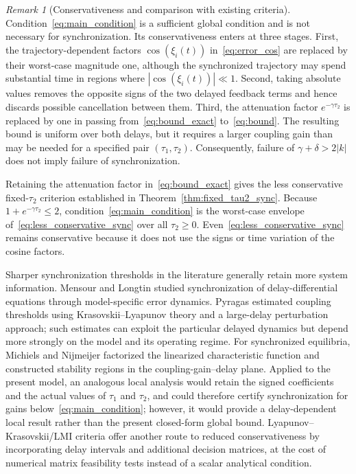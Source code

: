 \documentclass[11pt]{article}
\theoremstyle{remark}
\newtheorem{remark}[theorem]{Remark}
\begin{document}
{\begin{remark}[Conservativeness and comparison with existing criteria]
Condition~\eqref{eq:main_condition} is a sufficient global condition and is not necessary for synchronization. Its conservativeness enters at three stages. First, the trajectory-dependent factors $\cos(\xi_i(t))$ in~\eqref{eq:error_cos} are replaced by their worst-case magnitude one, although the synchronized trajectory may spend substantial time in regions where $|\cos(\xi_i(t))|\ll1$. Second, taking absolute values removes the opposite signs of the two delayed feedback terms and hence discards possible cancellation between them. Third, the attenuation factor $e^{-\gamma\tau_2}$ is replaced by one in passing from~\eqref{eq:bound_exact} to~\eqref{eq:bound}. The resulting bound is uniform over both delays, but it requires a larger coupling gain than may be needed for a specified pair $(\tau_1,\tau_2)$. Consequently, failure of $\gamma+\delta>2|k|$ does not imply failure of synchronization.

Retaining the attenuation factor in~\eqref{eq:bound_exact} gives the less conservative fixed-$\tau_2$ criterion established in Theorem~\ref{thm:fixed_tau2_sync}. Because $1+e^{-\gamma\tau_2}\leq2$, condition~\eqref{eq:main_condition} is the worst-case envelope of~\eqref{eq:less_conservative_sync} over all $\tau_2\geq0$. Even~\eqref{eq:less_conservative_sync} remains conservative because it does not use the signs or time variation of the cosine factors.

Sharper synchronization thresholds in the literature generally retain more system information. Mensour and Longtin \cite{mensour1998synchronization} studied synchronization of delay-differential equations through model-specific error dynamics. Pyragas \cite{pyragas1998synchronization} estimated coupling thresholds using Krasovskii--Lyapunov theory and a large-delay perturbation approach; such estimates can exploit the particular delayed dynamics but depend more strongly on the model and its operating regime. For synchronized equilibria, Michiels and Nijmeijer \cite{michiels2009synchronization} factorized the linearized characteristic function and constructed stability regions in the coupling-gain--delay plane. Applied to the present model, an analogous local analysis would retain the signed coefficients and the actual values of $\tau_1$ and $\tau_2$, and could therefore certify synchronization for gains below~\eqref{eq:main_condition}; however, it would provide a delay-dependent local result rather than the present closed-form global bound. Lyapunov--Krasovskii/LMI criteria offer another route to reduced conservativeness by incorporating delay intervals and additional decision matrices, at the cost of numerical matrix feasibility tests instead of a scalar analytical condition.


\end{remark}}
\end{document}
